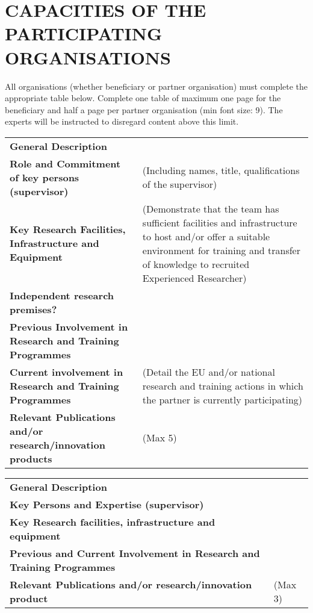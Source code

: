 \documentclass[a4paper,11pt]{article}
\renewcommand{\footnotesize}{\scriptsize} %
\begin{document}
\newpage
\section{CAPACITIES OF THE PARTICIPATING ORGANISATIONS}
\label{sec:capacities}

All organisations (whether beneficiary or partner organisation) must complete the appropriate table below. Complete one table of maximum one page for the beneficiary and half a page per partner organisation (min font size: 9). The experts will be instructed to disregard content above this limit.
\vspace{\baselineskip}

{\footnotesize %
\noindent\begin{tabular}{>{\raggedright}p{}p{}}
  \multicolumn{2}{l}{\textbf{Beneficiary X}} \\\midrule
\textbf{General Description} &

\\\midrule
\textbf{Role and Commitment of key persons (supervisor)} &
(Including names, title, qualifications of the supervisor)
\\\midrule
\textbf{Key Research Facilities, Infrastructure and Equipment} &
(Demonstrate that the team has sufficient facilities and infrastructure to host and/or offer a suitable environment for training and transfer of knowledge to recruited Experienced Researcher)
\\\midrule
\textbf{Independent research premises?} &

\\\midrule
\textbf{Previous Involvement in Research and Training Programmes} &

\\\midrule
\textbf{Current involvement in Research and Training Programmes} &
(Detail the EU and/or national research and training actions in which the partner is currently participating)
\\\midrule
\textbf{Relevant Publications and/or research/innovation products} &
(Max 5)
\\\bottomrule
\end{tabular}}
\vspace{\baselineskip}

{\footnotesize
\noindent\begin{tabular}{>{\raggedright}p{}p{}}
  \multicolumn{2}{l}{\textbf{Partner Organisation Y}} \\\midrule
\textbf{General Description} &

\\\midrule
\textbf{Key Persons and Expertise (supervisor)} &

\\\midrule
\textbf{Key Research facilities, infrastructure and equipment} &

\\\midrule
\textbf{Previous and Current Involvement in Research and Training Programmes} &

\\\midrule
\textbf{Relevant Publications and/or research/innovation product} &
(Max 3)
\\\bottomrule
\end{tabular}}
\end{document}
